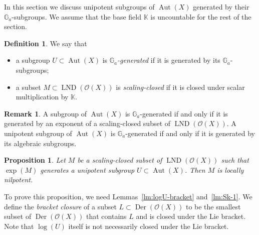\documentclass[12pt,a4paper]{amsart}
\theoremstyle{plain}
\newtheorem{proposition}[theorem]{Proposition}
\theoremstyle{definition}
\newtheorem{definition}[theorem]{Definition}
\newtheorem{remark}[theorem]{Remark}
\theoremstyle{remark}
\def\Aut{\operatorname{Aut}}
\def\Der{\operatorname{Der}}
\def\LND{\operatorname{LND}}
\def\K{{\mathbb K}}
\def\G{{\mathbb G}}
\def\cO{{\mathcal O}}
\begin{document}
In this section we discuss unipotent subgroups of $\Aut(X)$ generated by their $\G_a$-subgroups. 
We assume that the base field $\K$ is uncountable for the rest of the section.

      \begin{definition}\label{def:Ga-gen}
         We say that
         \begin{itemize}
            \item a subgroup $U\subset\Aut(X)$ is \emph{$\G_a$-generated} if it is generated by its $\G_a$-subgroups;
            \item a subset $M\subset \LND(\cO(X))$ is \emph{scaling-closed} if it is closed under scalar multiplication by $\K$. 
         \end{itemize}
      \end{definition}

      \begin{remark}\label{rm:Ga-gen}
         A subgroup of $\Aut(X)$ is $\G_a$-generated if and only if it is generated by an exponent of a scaling-closed subset of $\LND(\cO(X))$.   
      A unipotent subgroup of $\Aut(X)$ is $\G_a$-generated if and only if it is generated by its algebraic subgroups.
      \end{remark}
   

\begin{proposition}\label{pr:loc-nilp-logU}
   Let $M$ be a scaling-closed subset of $\LND(\cO(X))$ such that $\exp(M)$ generates a unipotent subgroup $U\subset\Aut(X)$.
   Then $M$ is locally nilpotent.
\end{proposition}

To prove this proposition, we need Lemmas~\ref{lm:logU-bracket} and~\ref{lm:Sk-1}.
We define the \emph{bracket closure} of a subset $L\subset\Der(\cO(X))$ to be the smallest subset of $\Der(\cO(X))$ that contains $L$ and is closed under the Lie bracket.
Note that $\log(U)$ itself is not necessarily closed under the Lie bracket.
\end{document}
